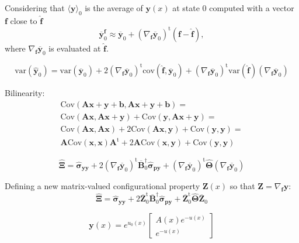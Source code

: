\documentclass[aip,jcp,reprint,amsmath,amssymb]{revtex4-1}
\newcommand{\mt}[1]{\boldsymbol{\mathbf{#1}}}           %
\newcommand{\vt}[1]{\boldsymbol{\mathbf{#1}}}           %
\newcommand{\tr}[1]{#1^\text{t}}                        %
\begin{document}
Considering that $\langle{\vt y}\rangle_0$ is the average of $\vt y(x)$ at state $0$ computed with a vector $\vt f$ close to $\hat{\vt f}$
\begin{equation*}
\overline{\vt y}^{\vt f}_0 \approx \overline{\vt y}_0 + \tr{(\nabla_{\vt f}\overline{\vt y}_0)}({\vt f} - \hat{\vt f}),
\end{equation*}
where $\nabla_{\vt f}\overline{\vt y}_0$ is evaluated at $\hat{\vt f}$.

\begin{equation}
\text{var}(\hat{\vt y}_0) = \text{var}(\overline{\vt y}_0) + 2\tr{(\nabla_{\vt f}\overline{\vt y}_0)}\text{cov}(\hat{\vt f},\overline{\vt y}_0) + \tr{(\nabla_{\vt f}\overline{\vt y}_0)}\text{var}(\hat{\vt f})(\nabla_{\vt f}\overline{\vt y}_0)
\end{equation}

Bilinearity:
\begin{gather*}
\text{Cov}(\mt A \mt x + \mt y + \vt b,\mt A \mt x + \mt y + \vt b) = \\ \text{Cov}(\mt A \mt x,\mt A \mt x + \mt y) + \text{Cov}(\mt y,\mt A \mt x + \mt y) = \\ \text{Cov}(\mt A \mt x,\mt A \mt x) + 2 \text{Cov}(\mt A \mt x,\mt y) + \text{Cov}(\mt y,\mt y) = \\ \mt A \text{Cov}(\mt x,\mt x) \tr{\mt A} + 2 \mt A \text{Cov}(\mt x,\mt y) + \text{Cov}(\mt y,\mt y)
\end{gather*}

\begin{equation}
\hat{\mt \Xi} = \hat{\mt \sigma}_{\vt y\vt y} + 2\tr{(\nabla_{\vt f}\overline{\vt y}_0)} \overline{\mt B}_0^\dag \hat{\mt \sigma}_{\vt p\vt y} + \tr{(\nabla_{\vt f}\overline{\vt y}_0)}\hat{\mt \Theta}{(\nabla_{\vt f}\overline{\vt y}_0)}
\end{equation}

Defining a new matrix-valued configurational property $\mt Z(x)$ so that $\mt Z = \nabla_{\vt f}\vt y$:
\begin{equation}
\hat{\mt \Xi} = \hat{\mt \sigma}_{\vt y\vt y} + 2\tr{\overline{\mt Z}_0} \overline{\mt B}_0^\dag \hat{\mt \sigma}_{\vt p\vt y} + \tr{\overline{\mt Z}_0}\hat{\mt \Theta}{\overline{\mt Z}_0}
\end{equation}

\begin{equation}
{\vt y}(x) = e^{u_0(x)} \left[\begin{array}{c} A(x)e^{-u(x)} \\ e^{-u(x)} \end{array}\right]
\end{equation}
\end{document}
